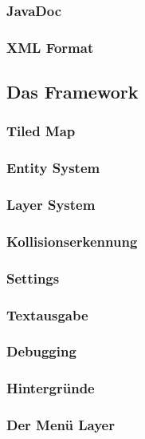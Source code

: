 		\subsubsection{JavaDoc}						
		\subsubsection{XML Format}					                 %
	\subsection{Das Framework}
		\subsubsection{Tiled Map}					
		\subsubsection{Entity System}				
		\subsubsection{Layer System}				
		\subsubsection{Kollisionserkennung}			
		\subsubsection{Settings}					
		\subsubsection{Textausgabe}					          %
		\subsubsection{Debugging}					           %
		\subsubsection{Hintergründe}				         %
		\subsubsection{Der Menü Layer}				           %
